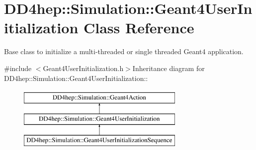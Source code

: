 \hypertarget{class_d_d4hep_1_1_simulation_1_1_geant4_user_initialization}{
\section{DD4hep::Simulation::Geant4UserInitialization Class Reference}
\label{class_d_d4hep_1_1_simulation_1_1_geant4_user_initialization}
}


Base class to initialize a multi-\/threaded or single threaded Geant4 application.  


{\ttfamily \#include $<$Geant4UserInitialization.h$>$}Inheritance diagram for DD4hep::Simulation::Geant4UserInitialization::\begin{figure}[H]
\begin{center}
\leavevmode
\includegraphics[height=3cm]{class_d_d4hep_1_1_simulation_1_1_geant4_user_initialization}
\end{center}
\end{figure}
